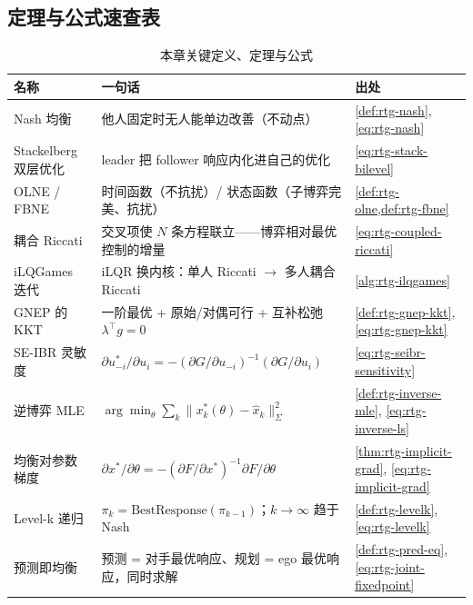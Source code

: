 \subsection*{定理与公式速查表}
\begin{table}[H]\centering\small
\caption{本章关键定义、定理与公式}
\label{tab:rtg-theorems}
\begin{tabular}{p{} p{} p{}}
\toprule
名称 & 一句话 & 出处 \\
\midrule
Nash 均衡 & 他人固定时无人能单边改善（不动点） & \cref{def:rtg-nash}, \cref{eq:rtg-nash} \\
Stackelberg 双层优化 & leader 把 follower 响应内化进自己的优化 & \cref{eq:rtg-stack-bilevel} \\
OLNE / FBNE & 时间函数（不抗扰）/ 状态函数（子博弈完美、抗扰） & \cref{def:rtg-olne,def:rtg-fbne} \\
耦合 Riccati & 交叉项使 $N$ 条方程联立——博弈相对最优控制的增量 & \cref{eq:rtg-coupled-riccati} \\
iLQGames 迭代 & iLQR 换内核：单人 Riccati $\to$ 多人耦合 Riccati & \cref{alg:rtg-ilqgames} \\
GNEP 的 KKT & 一阶最优 + 原始/对偶可行 + 互补松弛 $\lambda^\top g=0$ & \cref{def:rtg-gnep-kkt}, \cref{eq:rtg-gnep-kkt} \\
SE-IBR 灵敏度 & $\partial u_{-i}^*/\partial u_i=-(\partial G/\partial u_{-i})^{-1}(\partial G/\partial u_i)$ & \cref{eq:rtg-seibr-sensitivity} \\
逆博弈 MLE & $\arg\min_\theta\sum_k\lVert x_k^*(\theta)-\hat x_k\rVert_\Sigma^2$ & \cref{def:rtg-inverse-mle}, \cref{eq:rtg-inverse-ls} \\
均衡对参数梯度 & $\partial x^*/\partial\theta=-(\partial F/\partial x^*)^{-1}\partial F/\partial\theta$ & \cref{thm:rtg-implicit-grad}, \cref{eq:rtg-implicit-grad} \\
Level-k 递归 & $\pi_k=\mathrm{BestResponse}(\pi_{k-1})$；$k\to\infty$ 趋于 Nash & \cref{def:rtg-levelk}, \cref{eq:rtg-levelk} \\
预测即均衡 & 预测 = 对手最优响应、规划 = ego 最优响应，同时求解 & \cref{def:rtg-pred-eq}, \cref{eq:rtg-joint-fixedpoint} \\
\bottomrule
\end{tabular}
\end{table}

